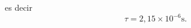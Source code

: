 \begin{solution}
es decir
\begin{equation*}
\tau =2,15\times 10^{-6}\text{s}.
\end{equation*}
\end{solution}

